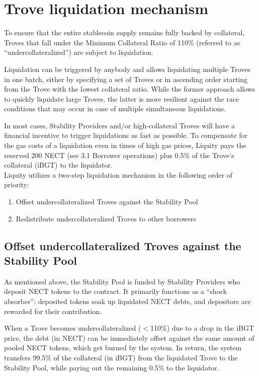 \documentclass{article}
\begin{document}
\section{Trove liquidation mechanism}
To ensure that the entire stablecoin supply remains fully backed by collateral, Troves that fall under the Minimum Collateral Ratio of 110\% (referred to as “undercollateralized”) are subject to liquidation.

Liquidation can be triggered by anybody and allows liquidating multiple Troves in one batch, either by specifying a set of Troves or in ascending order starting from the Trove with the lowest collateral ratio. While the former approach allows to quickly liquidate large Troves, the latter is more resilient against the race conditions that may occur in case of multiple simultaneous liquidations.

In most cases, Stability Providers and/or high-collateral Troves will have a financial incentive to trigger liquidations as fast as possible. To compensate for the gas costs of a liquidation even in times of high gas prices, Liquity pays the reserved 200 NECT (see 3.1 Borrower operations) plus 0.5\% of the Trove’s collateral (iBGT) to the liquidator.
\\

Liquity utilizes a two-step liquidation mechanism in the following order of priority:
\begin{enumerate}
    \item Offset undercollateralized Troves against the Stability Pool
    \item Redistribute undercollateralized Troves to other borrowers
\end{enumerate}

\subsection{Offset undercollateralized Troves against the Stability Pool}
As mentioned above, the Stability Pool is funded by Stability Providers who deposit NECT tokens to the contract. It primarily functions as a “shock absorber”: deposited tokens soak up liquidated NECT debts, and depositors are rewarded for their contribution. 

When a Trove becomes undercollateralized ($<$110\%) due to a drop in the iBGT price, the debt (in NECT) can be immediately offset against the same amount of pooled NECT tokens, which get burned by the system. In return, the system transfers 99.5\% of the collateral (in iBGT) from the liquidated Trove to the Stability Pool, while paying out the remaining 0.5\% to the liquidator.\\
\end{document}
